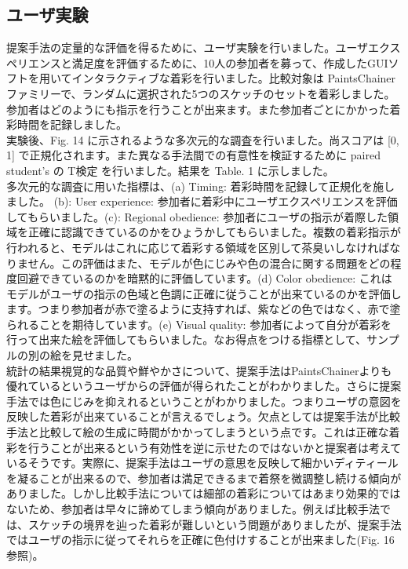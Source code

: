 \documentclass[a4paper, dvipdfmx, 10pt]{article}
\begin{document}
\subsection{ユーザ実験}
\label{sec:org63565fc}
提案手法の定量的な評価を得るために、ユーザ実験を行いました。ユーザエクスペリエンスと満足度を評価するために、10人の参加者を募って、作成したGUIソフトを用いてインタラクティブな着彩を行いました。比較対象は PaintsChainer ファミリーで、ランダムに選択された5つのスケッチのセットを着彩しました。参加者はどのようにも指示を行うことが出来ます。また参加者ごとにかかった着彩時間を記録しました。\\

実験後、Fig. 14 に示されるような多次元的な調査を行いました。尚スコアは [0, 1] で正規化されます。また異なる手法間での有意性を検証するために paired student's の T検定 を行いました。結果を Table. 1 に示しました。\\

多次元的な調査に用いた指標は、(a) Timing: 着彩時間を記録して正規化を施しました。 (b): User experience: 参加者に着彩中にユーザエクスペリエンスを評価してもらいました。(c): Regional obedience: 参加者にユーザの指示が着際した領域を正確に認識できているのかをひょうかしてもらいました。複数の着彩指示が行われると、モデルはこれに応じて着彩する領域を区別して茶臭いしなければなりません。この評価はまた、モデルが色にじみや色の混合に関する問題をどの程度回避できているのかを暗黙的に評価しています。(d) Color obedience: これはモデルがユーザの指示の色域と色調に正確に従うことが出来ているのかを評価します。つまり参加者が赤で塗るように支持すれば、紫などの色ではなく、赤で塗られることを期待しています。(e) Visual quality: 参加者によって自分が着彩を行って出来た絵を評価してもらいました。なお得点をつける指標として、サンプルの別の絵を見せました。\\

統計の結果視覚的な品質や鮮やかさについて、提案手法はPaintsChainerよりも優れているというユーザからの評価が得られたことがわかりました。さらに提案手法では色にじみを抑えれるということがわかりました。つまりユーザの意図を反映した着彩が出来ていることが言えるでしょう。欠点としては提案手法が比較手法と比較して絵の生成に時間がかかってしまうという点です。これは正確な着彩を行うことが出来るという有効性を逆に示せたのではないかと提案者は考えているそうです。実際に、提案手法はユーザの意思を反映して細かいディティールを凝ることが出来るので、参加者は満足できるまで着祭を微調整し続ける傾向がありました。しかし比較手法については細部の着彩についてはあまり効果的ではないため、参加者は早々に諦めてしまう傾向がありました。例えば比較手法では、スケッチの境界を辿った着彩が難しいという問題がありましたが、提案手法ではユーザの指示に従ってそれらを正確に色付けすることが出来ました(Fig. 16 参照)。\\
\end{document}
